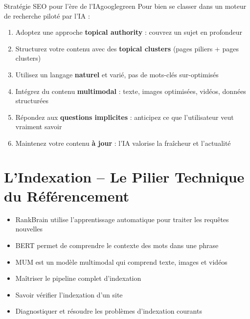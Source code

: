 \documentclass[12pt,a4paper,twoside]{report}
\newcommand{\keyword}[1]{\textbf{\textcolor{googleblue}{#1}}}
\newcommand{\important}[1]{\textbf{\textcolor{googlered}{#1}}}
\newcommand{\level}[1]{\medskip\bigskip}
\begin{document}
\begin{mybox}{Stratégie SEO pour l'ère de l'IA}{googlegreen}
Pour bien se classer dans un moteur de recherche piloté par l'IA :
\begin{enumerate}
    \item Adoptez une approche \keyword{topical authority} : couvrez un sujet en profondeur
    \item Structurez votre contenu avec des \keyword{topical clusters} (pages piliers + pages clusters)
    \item Utilisez un langage \important{naturel} et varié, pas de mots-clés sur-optimisés
    \item Intégrez du contenu \keyword{multimodal} : texte, images optimisées, vidéos, données structurées
    \item Répondez aux \keyword{questions implicites} : anticipez ce que l'utilisateur veut vraiment savoir
    \item Maintenez votre contenu \keyword{à jour} : l'IA valorise la fraîcheur et l'actualité
\end{enumerate}
\end{mybox}


\part{L'Indexation -- Le Pilier Technique du Référencement}
\label{part:indexation}

\begin{takeaways}
\begin{itemize}
    \item RankBrain utilise l'apprentissage automatique pour traiter les requêtes nouvelles
    \item BERT permet de comprendre le contexte des mots dans une phrase
    \item MUM est un modèle multimodal qui comprend texte, images et vidéos
\end{itemize}
\end{takeaways}

\level{1}
\begin{objectives}
\begin{itemize}
    \item Maîtriser le pipeline complet d'indexation
    \item Savoir vérifier l'indexation d'un site
    \item Diagnostiquer et résoudre les problèmes d'indexation courants
\end{itemize}
\end{objectives}
\end{document}
